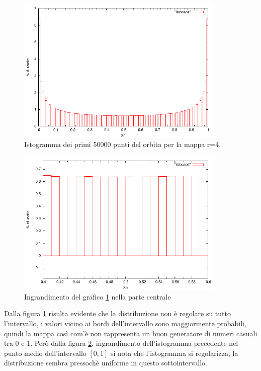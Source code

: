 \documentclass[13pt]{article}
\begin{document}
\begin{figure}[!h]
\centering
\includegraphics[width=10cm,keepaspectratio]{picture/mappacaos/istocaos}
\caption{Istogramma dei primi 50000 punti del orbita per la mappa r=4.}
\label{fig:istocaos}
\end{figure}


\begin{figure}[!h]
\centering
\includegraphics[width=10cm,keepaspectratio]{picture/mappacaos/istocaoszoom}
\caption{Ingrandimento del grafico \ref{fig:istocaos} nella parte centrale}
\label{fig:zoomistocaos}
\end{figure}

Dalla figura \ref{fig:istocaos} risulta evidente che la distribuzione non è regolare su tutto l'intervallo, i valori vicino ai bordi dell'intervallo sono maggiormente probabili, quindi la mappa così com'è non rappresenta un buon generatore di numeri casuali tra 0 e 1.
Però dalla figura \ref{fig:zoomistocaos}, ingrandimento dell'istogramma precedente nel punto medio dell'intervallo $[0,1]$ si nota che l'istogramma si regolarizza, la distribuzione sembra pressochè uniforme in questo sottointervallo.
\end{document}
